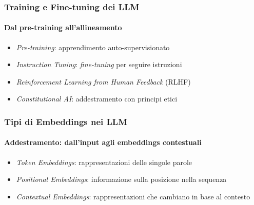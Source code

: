 %
\begin{frame}[t,fragile] \frametitle{Training e Fine-tuning dei LLM}
    \framesubtitle{Dal pre-training all'allineamento}
    {\normalsize
        \begin{minipage}[t]{\textwidth}
            \begin{itemize}[leftmargin=10pt,align=right]
                \item[\alert{\faArrowCircleRight}] \alert{\textit{Pre-training}:} apprendimento auto-supervisionato
                \item[\alert{\faArrowCircleRight}] \alert{\textit{Instruction Tuning}:} \textit{fine-tuning} per seguire istruzioni
                \item[\alert{\faArrowCircleRight}] \alert{\textit{Reinforcement Learning from Human Feedback}} (RLHF)
                \item[\alert{\faArrowCircleRight}] \alert{\textit{Constitutional AI}:} addestramento con principi etici
            \end{itemize}
        \end{minipage}
    }
\end{frame}
%
\begin{frame}[t,fragile] \frametitle{Tipi di Embeddings nei LLM}
    \framesubtitle{Addestramento: dall'input agli embeddings contestuali}
    {\small
        \begin{itemize}[leftmargin=10pt,align=right]
            \item[\alert{\faArrowCircleRight}] \alert{\textit{Token Embeddings}:} rappresentazioni delle singole parole
            \item[\alert{\faArrowCircleRight}] \alert{\textit{Positional Embeddings}:} informazione sulla posizione nella sequenza
            \item[\alert{\faArrowCircleRight}] \alert{\textit{Contextual Embeddings}:} rappresentazioni che cambiano in base al contesto
        \end{itemize}
    }
\end{frame}
%
